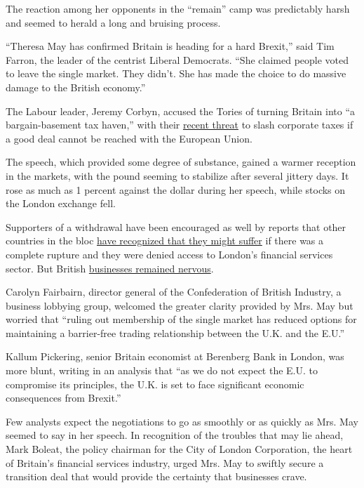 The reaction among her opponents in the ``remain'' camp was predictably
harsh and seemed to herald a long and bruising process.

``Theresa May has confirmed Britain is heading for a hard Brexit,'' said
Tim Farron, the leader of the centrist Liberal Democrats. ``She claimed
people voted to leave the single market. They didn't. She has made the
choice to do massive damage to the British economy.''

The Labour leader, Jeremy Corbyn, accused the Tories of turning Britain
into ``a bargain-basement tax haven,'' with their
\href{https://www.welt.de/english-news/article161182946/Philip-Hammond-issues-threat-to-EU-partners.html}{recent
threat} to slash corporate taxes if a good deal cannot be reached with
the European Union.

The speech, which provided some degree of substance, gained a warmer
reception in the markets, with the pound seeming to stabilize after
several jittery days. It rose as much as 1 percent against the dollar
during her speech, while stocks on the London exchange fell.

Supporters of a withdrawal have been encouraged as well by reports that
other countries in the bloc
\href{https://www.theguardian.com/business/2017/jan/13/eu-negotiator-wants-special-deal-over-access-to-city-post-brexit}{have
recognized that they might suffer} if there was a complete rupture and
they were denied access to London's financial services sector. But
British
\href{https://www.nytimes.com/2017/01/15/world/europe/brexit-firms-business-relocate.html}{businesses
remained nervous}.

Carolyn Fairbairn, director general of the Confederation of British
Industry, a business lobbying group, welcomed the greater clarity
provided by Mrs. May but worried that ``ruling out membership of the
single market has reduced options for maintaining a barrier-free trading
relationship between the U.K. and the E.U.''

Kallum Pickering, senior Britain economist at Berenberg Bank in London,
was more blunt, writing in an analysis that ``as we do not expect the
E.U. to compromise its principles, the U.K. is set to face significant
economic consequences from Brexit.''

Few analysts expect the negotiations to go as smoothly or as quickly as
Mrs. May seemed to say in her speech. In recognition of the troubles
that may lie ahead, Mark Boleat, the policy chairman for the City of
London Corporation, the heart of Britain's financial services industry,
urged Mrs. May to swiftly secure a transition deal that would provide
the certainty that businesses crave.

